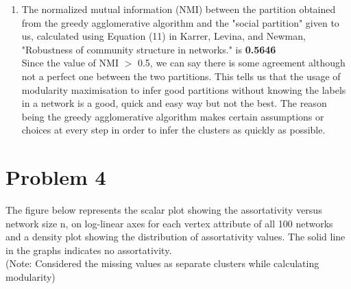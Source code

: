 \documentclass{article}
\begin{document}
\begin{enumerate}[label=(\roman*)]
\item
The normalized mutual information (NMI) between the partition obtained from the greedy agglomerative algorithm and the "social partition" given to us, calculated using Equation (11) in Karrer, Levina, and Newman, "Robustness of community structure in networks." is \textbf{0.5646}\\

Since the value of NMI $>$ 0.5, we can say there is some agreement although not a perfect one between the two partitions. This tells us that	 the usage of modularity maximisation to infer good partitions without knowing the labels in a network is a good, quick and easy way but not the best. The reason being the greedy agglomerative algorithm makes certain assumptions or choices at every step in order to infer the clusters as quickly as possible.

\end{enumerate}
\newpage
\section*{Problem 4}
The figure below represents the scalar plot showing the assortativity  versus network size n, on log-linear axes for each vertex attribute of all 100 networks and a density plot showing the distribution of assortativity values. The solid line in the graphs indicates no assortativity.\\

(Note: Considered the missing values as separate clusters while calculating modularity)
 
\end{document}
